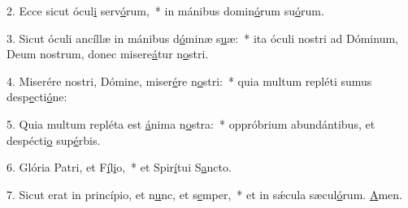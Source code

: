 2. Ecce sicut ócul\uline{i} serv\uline{ó}rum,~* in mánibus domin\uline{ó}rum su\uline{ó}rum.\par 
3. Sicut óculi ancíllæ in mánibus d\uline{ó}minæ s\uline{u}æ:~* ita óculi nostri ad Dóminum, Deum nostrum, donec misere\uline{á}tur n\uline{o}stri.\par 
4. Miserére nostri, Dómine, miser\uline{é}re n\uline{o}stri:~* quia multum repléti sumus desp\uline{e}cti\uline{ó}ne:\par 
5. Quia multum repléta est \uline{á}nima n\uline{o}stra:~* oppróbrium abundántibus, et despécti\uline{o} sup\uline{é}rbis.\par 
6. Glória Patri, et F\uline{í}l\uline{i}o,~* et Spir\uline{í}tui S\uline{a}ncto.\par 
7. Sicut erat in princípio, et n\uline{u}nc, et s\uline{e}mper,~* et in sǽcula sæcul\uline{ó}rum. \uline{A}men.\par 
